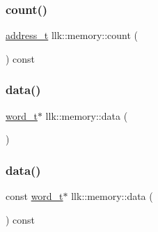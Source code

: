 \mbox{\label{classllk_1_1memory_a5efebebcf80bc1d7f9314ac0e046ee41}} 
\subsubsection{\texorpdfstring{count()}{count()}}
{\footnotesize\ttfamily \hyperlink{classllk_1_1memory_ae7a4b897aa999f22e250dc8e4d773dec}{address\+\_\+t} llk\+::memory\+::count (\begin{DoxyParamCaption}{ }\end{DoxyParamCaption}) const\hspace{0.3cm}{\ttfamily [inline]}}

\mbox{\label{classllk_1_1memory_a5d840d8417c2cdb37ec1f77ecb0fec6e}} 
\subsubsection{\texorpdfstring{data()}{data()}\hspace{0.1cm}{\footnotesize\ttfamily [1/2]}}
{\footnotesize\ttfamily \hyperlink{classllk_1_1memory_a432a6c0ae1bcb9c44d79cfa1a239419c}{word\+\_\+t}$\ast$ llk\+::memory\+::data (\begin{DoxyParamCaption}{ }\end{DoxyParamCaption})\hspace{0.3cm}{\ttfamily [inline]}}

\mbox{\label{classllk_1_1memory_aea2feb3e69edfa3968fcc715d7a05238}} 
\subsubsection{\texorpdfstring{data()}{data()}\hspace{0.1cm}{\footnotesize\ttfamily [2/2]}}
{\footnotesize\ttfamily const \hyperlink{classllk_1_1memory_a432a6c0ae1bcb9c44d79cfa1a239419c}{word\+\_\+t}$\ast$ llk\+::memory\+::data (\begin{DoxyParamCaption}{ }\end{DoxyParamCaption}) const\hspace{0.3cm}{\ttfamily [inline]}}

